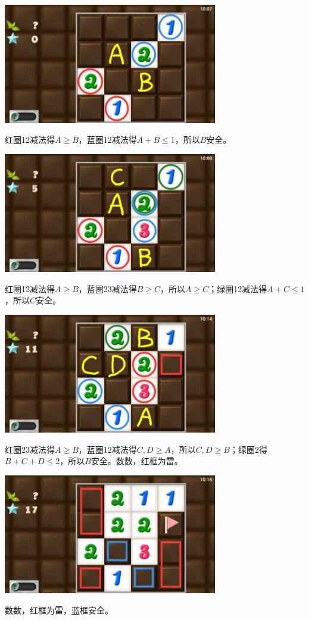 \subsection{} %
\begin{center}
    \includegraphics[width=0.7\textwidth]{puzzlelow/174-1.jpg}
\end{center}
红圈12减法得$A\ge B$，蓝圈12减法得$A+B\le 1$，所以$B$安全。
\begin{center}
    \includegraphics[width=0.7\textwidth]{puzzlelow/174-2.jpg}
\end{center}
红圈12减法得$A\ge B$，蓝圈23减法得$B\ge C$，所以$A\ge C$；绿圈12减法得$A+C\le 1$，所以$C$安全。
\begin{center}
    \includegraphics[width=0.7\textwidth]{puzzlelow/174-3.jpg}
\end{center}
红圈23减法得$A\ge B$，蓝圈12减法得$C,D\ge A$，所以$C,D\ge B$；绿圈2得$B+C+D\le 2$，所以$B$安全。数数，红框为雷。
\begin{center}
    \includegraphics[width=0.7\textwidth]{puzzlelow/174-4.jpg}
\end{center}
数数，红框为雷，蓝框安全。


